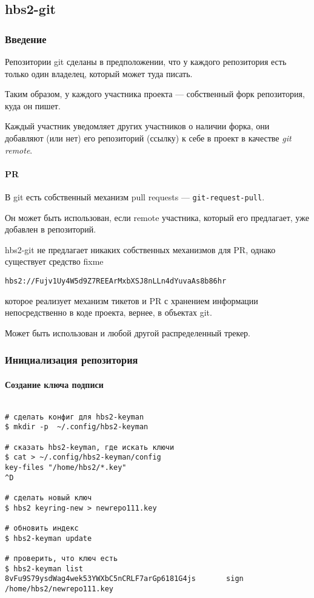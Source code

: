 \documentclass[11pt,a4paper]{article}
\begin{document}
\subsection{hbs2-git}

\subsubsection{Введение}

Репозитории git сделаны в предположении, что у каждого репозитория
есть только один владелец, который может туда писать.

Таким образом, у каждого участника проекта --- собственный форк
репозитория, куда он пишет.

Каждый участник уведомляет других участников о наличии форка,
они добавляют (или нет) его репозиторий (ссылку) к себе в проект
в качестве \textit{git remote}.

\paragraph{PR}

В git есть собственный механизм pull requests --- \texttt{git-request-pull}.

Он может быть использован, если remote участника, который его предлагает,
уже добавлен в репозиторий.

hbs2-git не предлагает никаких собственных механизмов для PR, однако
существует средство fixme

\texttt{hbs2://Fujv1Uy4W5d9Z7REEArMxbXSJ8nLLn4dYuvaAs8b86hr}

которое реализует механизм тикетов и PR с хранением информации непосредственно
в коде проекта, вернее, в объектах git.

Может быть использован и любой другой распределенный трекер.

\subsubsection{Инициализация репозитория}

\paragraph{Создание ключа подписи}

\begin{verbatim}

# сделать конфиг для hbs2-keyman
$ mkdir -p  ~/.config/hbs2-keyman

# сказать hbs2-keyman, где искать ключи
$ cat > ~/.config/hbs2-keyman/config
key-files "/home/hbs2/*.key"
^D

# сделать новый ключ
$ hbs2 keyring-new > newrepo111.key

# обновить индекс
$ hbs2-keyman update

# проверить, что ключ есть
$ hbs2-keyman list
8vFu9S79ysdWag4wek53YWXbC5nCRLF7arGp6181G4js       sign       /home/hbs2/newrepo111.key

\end{verbatim}
\end{document}

